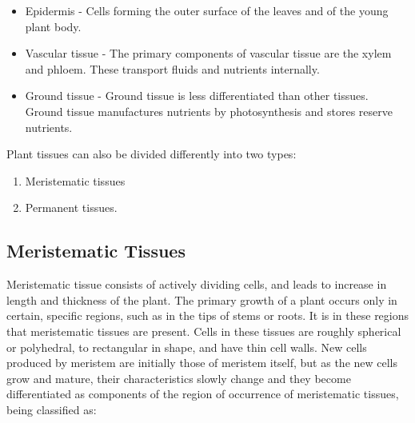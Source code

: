 \begin{itemize}
\tightlist
\item
  Epidermis - Cells forming the outer surface of the leaves and of the young plant body.
\item
  Vascular tissue - The primary components of vascular tissue are the xylem and phloem. These transport fluids and nutrients internally.
\item
  Ground tissue - Ground tissue is less differentiated than other tissues. Ground tissue manufactures nutrients by photosynthesis and stores reserve nutrients.
\end{itemize}

Plant tissues can also be divided differently into two types:

\begin{enumerate}
\def\labelenumi{\arabic{enumi}.}
\tightlist
\item
  Meristematic tissues
\item
  Permanent tissues.
\end{enumerate}

\hypertarget{meristematic-tissues}{%
\subsection{Meristematic Tissues}\label{meristematic-tissues}}

Meristematic tissue consists of actively dividing cells, and leads to increase in length and thickness of the plant. The primary growth of a plant occurs only in certain, specific regions, such as in the tips of stems or roots. It is in these regions that meristematic tissues are present. Cells in these tissues are roughly spherical or polyhedral, to rectangular in shape, and have thin cell walls. New cells produced by meristem are initially those of meristem itself, but as the new cells grow and mature, their characteristics slowly change and they become differentiated as components of the region of occurrence of meristematic tissues, being classified as:

